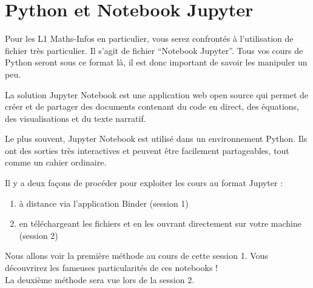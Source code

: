 \documentclass{article}
\begin{document}
\newpage

\section{Python et Notebook Jupyter}

Pour les L1 Maths-Infos en particulier, vous serez confrontés à l'utilisation de fichier très particulier. Il s'agit de fichier ``Notebook Jupyter''. Tous vos cours de Python seront sous ce format là,
il est donc important de savoir les manipuler un peu.

La solution Jupyter Notebook est une application web open source qui permet de créer et de partager des documents contenant du code en direct, des équations, des visualisations et du texte narratif. 

Le plus souvent, Jupyter Notebook est utilisé dans un environnement Python. Ils ont des sorties très interactives et peuvent être facilement partageables, tout comme un cahier ordinaire.

Il y a deux fa\c cons de procéder pour exploiter les cours au format Jupyter : 

\begin{enumerate}
\item à distance via l'application Binder (session 1)
\item en téléchargeant les fichiers et en les ouvrant directement sur votre machine (session 2)
\end{enumerate}

Nous allons voir la première méthode au cours de cette session 1. Vous découvrirez les fameuses particularités de ces notebooks !\\
La deuxième méthode sera vue lors de la session 2.

\newpage
\end{document}
